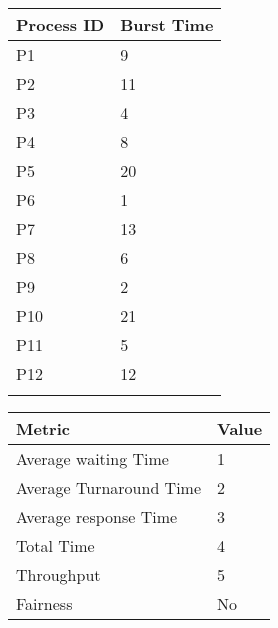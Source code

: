 \documentclass{article}
\begin{document}
\vspace{\baselineskip}
\hspace{1cm}
\begin{minipage}[t]{0.3\textwidth}
    \begin{tabularx}{\textwidth}{|l|X|}
    \hline
    \rowcolor{darkblue}
    \textbf{Process ID} & \textbf{Burst Time}\\
    \hline
    \rowcolor{lightblue}
    P1 & 9 \\
    P2 & 11 \\
    \rowcolor{lightblue}
    P3 & 4 \\
    P4 & 8 \\
    \rowcolor{lightblue}
    P5 & 20 \\
    P6 & 1 \\
    \rowcolor{lightblue}
    P7 & 13 \\
    P8 & 6 \\
    \rowcolor{lightblue}
    P9 & 2 \\
    P10 & 21 \\
    \rowcolor{lightblue}
    P11 & 5 \\
    P12 & 12 \\
    \rowcolor{lightblue}
    \hline
    \end{tabularx}
\end{minipage}
\hspace{2cm}
\begin{minipage}[t!]{0.35\textwidth}
    \begin{tabularx}{\textwidth}{|l|X|}
    \hline
    \rowcolor{darkblue}
    \textbf{Metric} & \textbf{Value} \\
    \hline
    \rowcolor{lightblue}
    Average waiting Time & 1 \\
    Average Turnaround Time & 2 \\
    \rowcolor{lightblue}
    Average response Time & 3 \\
    Total Time & 4 \\
    \rowcolor{lightblue}
    Throughput & 5 \\
    Fairness & No \\
    \hline
    \end{tabularx}
\end{minipage}

\bigskip
\end{document}
